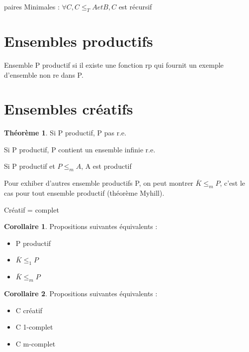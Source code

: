 \documentclass{book}
\theoremstyle{definition}
\newtheorem{theorem}{Théorème}
\newtheorem{corollary}{Corollaire}
\numberwithin{lemma}{subsection}
\numberwithin{theorem}{subsection}
\numberwithin{definition}{subsection}
\numberwithin{proposition}{subsection}
\numberwithin{corollary}{subsection}
\numberwithin{property}{subsection}
\numberwithin{example}{subsection}
\numberwithin{heuristique}{subsection}
\numberwithin{scenario}{subsection}
\begin{document}
\par paires Minimales : $\forall C, C \leqslant_T A et B, C$ est récursif

\section{Ensembles productifs}

Ensemble P productif si il existe une fonction rp qui fournit un exemple d'ensemble non re dans P.

\section{Ensembles créatifs}

\begin{theorem}
Si P productif, P pas r.e.
\par Si P productif, P contient un ensemble infinie r.e.
\par Si P productif et $P\leqslant_mA$, A est productif
\end{theorem}

Pour exhiber d'autres ensemble productifs P, on peut montrer $\bar{K} \leqslant_m P$, c'est le cas pour tout ensemble productif (théorème Myhill).

\par Créatif = complet
\begin{corollary}
Propositions suivantes équivalents :
\begin{itemize}
    \item P productif
    \item $\bar{K} \leqslant_1 P$
    \item $\bar{K} \leqslant_m P$
\end{itemize}
\end{corollary}
\begin{corollary}
Propositions suivantes équivalents :
\begin{itemize}
    \item C créatif
    \item C 1-complet
    \item C m-complet
\end{itemize}
\end{corollary}
\end{document}
